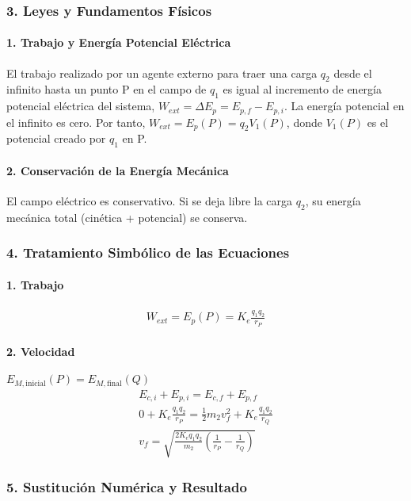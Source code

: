 \subsubsection*{3. Leyes y Fundamentos Físicos}
\paragraph*{1. Trabajo y Energía Potencial Eléctrica}
El trabajo realizado por un agente externo para traer una carga $q_2$ desde el infinito hasta un punto P en el campo de $q_1$ es igual al incremento de energía potencial eléctrica del sistema, $W_{ext} = \Delta E_p = E_{p,f} - E_{p,i}$. La energía potencial en el infinito es cero. Por tanto, $W_{ext} = E_p(P) = q_2 V_1(P)$, donde $V_1(P)$ es el potencial creado por $q_1$ en P.

\paragraph*{2. Conservación de la Energía Mecánica}
El campo eléctrico es conservativo. Si se deja libre la carga $q_2$, su energía mecánica total (cinética + potencial) se conserva.

\subsubsection*{4. Tratamiento Simbólico de las Ecuaciones}
\paragraph*{1. Trabajo}
\begin{gather}
    W_{ext} = E_p(P) = K_e \frac{q_1 q_2}{r_P}
\end{gather}
\paragraph*{2. Velocidad}
$E_{M, \text{inicial}}(P) = E_{M, \text{final}}(Q)$
\begin{gather}
    E_{c,i} + E_{p,i} = E_{c,f} + E_{p,f} \nonumber \\[8pt]
    0 + K_e \frac{q_1 q_2}{r_P} = \frac{1}{2} m_2 v_f^2 + K_e \frac{q_1 q_2}{r_Q} \nonumber \\[8pt]
    v_f = \sqrt{\frac{2 K_e q_1 q_2}{m_2} \left(\frac{1}{r_P} - \frac{1}{r_Q}\right)}
\end{gather}

\subsubsection*{5. Sustitución Numérica y Resultado}
